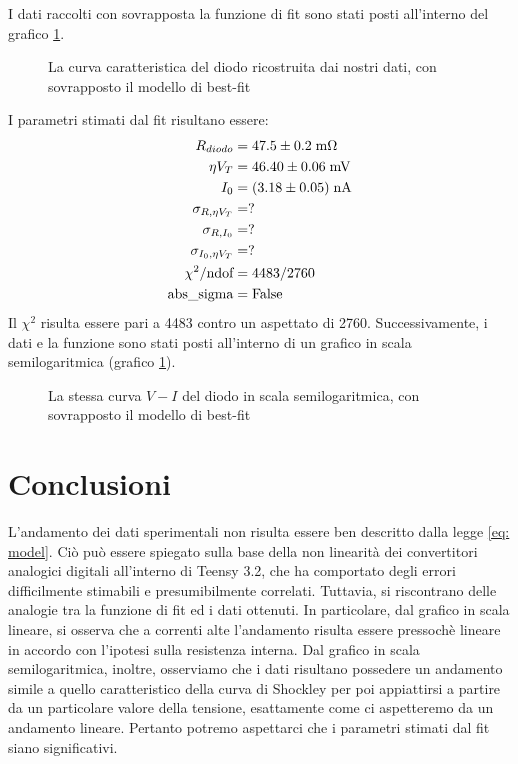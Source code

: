 \documentclass{article}[a4paper, oneside, 11pt]
\begin{document}
I dati raccolti con sovrapposta la funzione di fit sono stati posti all'interno 
del grafico \ref{fig: sck_lin}.
\begin{figure}[!htb]
	\centering 
	\caption{La curva caratteristica del diodo ricostruita dai nostri
	dati, con sovrapposto il modello di best-fit \label{fig: sck_lin}}
\end{figure}
I parametri stimati dal fit risultano essere:
\begin{align*}
	R_{diodo} &= 47.5 \pm 0.2 \; \rm m\Omega \\
	\eta V_T &= 46.40 \pm 0.06 \; \rm mV \\
	I_0 &= (3.18 \pm 0.05) \; \rm nA \\
	\sigma_{R, \eta V_T} &= ? \\   
	\sigma_{R, I_0} &= ? \\
	\sigma_{I_0, \eta V_T} &= ? \\
	\chi^2/\text{ndof} &= 4483/2760 \\
	\text{abs\_sigma} &= \rm False
\end{align*}
Il $\chi^2$ risulta essere pari a 4483 contro un aspettato di 2760.
Successivamente, i dati e la funzione sono stati posti all'interno di un
grafico in scala semilogaritmica (grafico \ref{fig: sck_lin}).
\begin{figure}[!htb]
	\centering 
	\caption{La stessa curva $V-I$ del diodo in scala semilogaritmica,
	con sovrapposto il modello di best-fit \label{fig: sck_log}}
\end{figure}

\section{Conclusioni}
L'andamento dei dati sperimentali non risulta essere ben descritto dalla legge
\eqref{eq: model}. Ciò può essere spiegato sulla base della non linearità dei
convertitori analogici digitali all'interno di Teensy 3.2, che ha comportato
degli errori difficilmente stimabili e presumibilmente correlati. Tuttavia, si
riscontrano delle analogie tra la funzione di fit ed i dati ottenuti. In
particolare, dal grafico in scala lineare, si osserva che a correnti alte
l'andamento risulta essere pressoch\`e lineare in accordo con l'ipotesi sulla
resistenza interna. Dal grafico in scala semilogaritmica, inoltre, osserviamo
che i dati risultano possedere un andamento simile a quello caratteristico 
della curva di Shockley per poi appiattirsi a partire da un particolare valore
della tensione, esattamente come ci aspetteremo da un andamento lineare.
Pertanto potremo aspettarci che i parametri stimati dal fit siano significativi.
\end{document}
